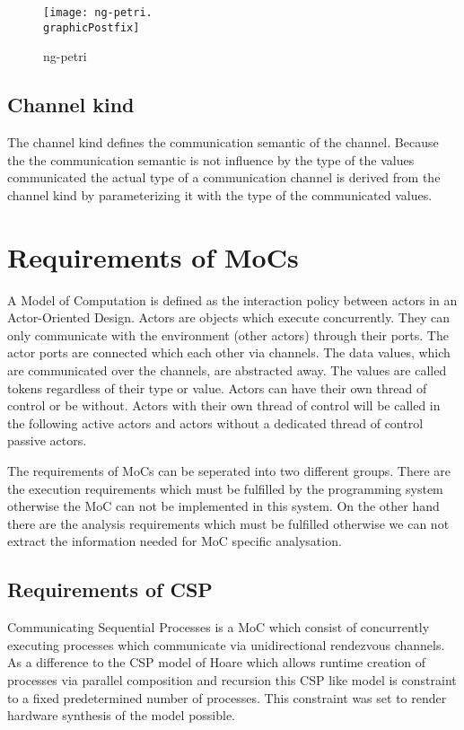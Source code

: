 \begin{figure}
\centering
\texttt{[image: ng-petri.\\graphicPostfix]}\\
\caption{\label{ng-petri}ng-petri}
\end{figure}

\subsection{Channel kind}

The channel kind defines the communication semantic of the channel.
Because the the communication semantic is not influence by the
type of the values communicated the actual type of a communication
channel is derived from the channel kind by parameterizing it with
the type of the communicated values.

\section{Requirements of MoCs}\label{Requirements of MoCs}

A Model of Computation is defined \cite{embsft:2002} as the 
interaction policy between actors in an Actor-Oriented Design.
Actors are objects which execute concurrently. They can only
communicate with the environment (other actors) through their ports.
The actor ports are connected which each other via channels.
The data values, which are communicated over the channels,
are abstracted away. The values are called tokens regardless
of their type or value.
Actors can have their own thread of control or be without. Actors
with their own thread of control will be called in the following
active actors and actors without a dedicated thread of control
passive actors.

The requirements of MoCs can be seperated into two different groups.
There are the execution requirements which must be fulfilled by
the programming system otherwise the MoC can not be implemented in
this system.
On the other hand there are the analysis requirements which
must be fulfilled otherwise we can not extract the information
needed for MoC specific analysation.

\subsection{Requirements of CSP}
Communicating Sequential Processes \cite{csphoare:1985}
is a MoC which consist of concurrently executing processes
which communicate via unidirectional rendezvous channels.
As a difference to the CSP model of Hoare which allows
runtime creation of processes via parallel composition and 
recursion this CSP like model is constraint to a fixed
predetermined number of processes. This constraint was
set to render hardware synthesis of the model possible.

